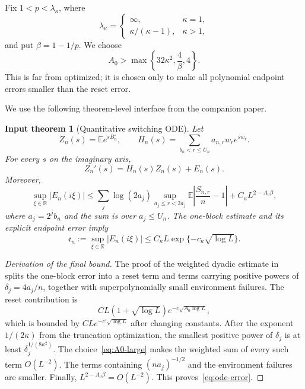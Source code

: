 \documentclass[11pt]{article}
\newtheorem{inputtheorem}[theorem]{Input theorem}
\theoremstyle{remark}
\newcommand{\Ee}{\mathbb E}
\begin{document}
Fix $1<p<\lambda_\kappa$, where
\[
 \lambda_\kappa=
 \begin{cases}
 \infty,&\kappa=1,\\
 \kappa/(\kappa-1),&\kappa>1,
 \end{cases}
\]
and put $\beta=1-1/p$.  We choose
\begin{equation}
\label{eq:A0-large}
 A_0>\max\left\{32\kappa^2,\frac4\beta,4\right\}.
\end{equation}
This is far from optimized; it is chosen only to make all polynomial
endpoint errors smaller than the reset error.

We use the following theorem-level interface from the companion paper.

\begin{inputtheorem}[Quantitative switching ODE]
\label{input:ode}
Let
\[
 Z_n(s)=\Ee e^{sB_n^\circ},
 \qquad
 H_n(s)=\sum_{b_n<r\le U_n}a_{n,r}w_re^{sw_r}.
\]
For every $s$ on the imaginary axis,
\begin{equation}
\label{eq:ode}
 Z_n'(s)=H_n(s)Z_n(s)+E_n(s).
\end{equation}
Moreover,
\begin{equation}
\label{eq:ode-error-raw}
 \sup_{\xi\in\mathbb R}|E_n(i\xi)|
 \le
 \sum_j\log(2a_j)
 \sup_{a_j\le r<2a_j}
 \Ee\left|\frac{S_{n,r}}n-1\right|
 +C_\kappa L^{2-A_0\beta},
\end{equation}
where $a_j=2^jb_n$ and the sum is over $a_j\le U_n$.
The one-block estimate and its explicit endpoint error imply
\begin{equation}
\label{eq:ode-error}
 \mathfrak e_n:=\sup_{\xi\in\mathbb R}|E_n(i\xi)|
 \le C_\kappa L\exp\{-c_\kappa\sqrt{\log L}\}.
\end{equation}
\end{inputtheorem}

\begin{proof}[Derivation of the final bound]
The proof of the weighted dyadic estimate in~\cite{LongOrder2026} splits
the one-block error into a reset term and terms carrying positive powers of
$\delta_j=4a_j/n$, together with superpolynomially small environment
failures.  The reset contribution is
\[
 C L(1+\sqrt{\log L})
 e^{-c\sqrt{A_0\log L}},
\]
which is bounded by $CL e^{-c'\sqrt{\log L}}$ after changing constants.
After the exponent $1/(2\kappa)$ from the truncation optimization, the
smallest positive power of $\delta_j$ is at least
$\delta_j^{1/(8\kappa^2)}$.  The choice~\eqref{eq:A0-large} makes the
weighted sum of every such term $O(L^{-2})$.  The terms containing
$(na_j)^{-1/2}$ and the environment failures are smaller.  Finally,
$L^{2-A_0\beta}=O(L^{-2})$.  This proves~\eqref{eq:ode-error}.
\end{proof}
\end{document}
